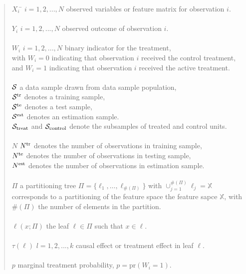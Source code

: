 \documentclass[11pt]{article}
\newcommand{\est}{{\rm est}}
\newcommand{\calp}{{\Pi}}
\newcommand{\cals}{{\cal S}}
\newcommand{\train}{{\rm tr}}
\newcommand{\test}{{\rm te}}
\begin{document}
\begin{quote}
\begin{tabbing}
$X_i$ \qquad\qquad \= $i = 1, 2,..., N$ \qquad observed variables or feature matrix for observation $i$.\\
\\
$Y_i$ \> $i = 1, 2, ..., N$ \qquad observed outcome of observation $i$.\\
\\
$W_i$ \>$i = 1, 2, ..., N$ \qquad binary indicator for the treatment,\\
\>with $W_i = 0$ indicating that observation $i$ received the control treatment, \\
\>and $W_i = 1$ indicating that observation $i$ received the active treatment.\\
\\
$\cals$ \> a data sample drawn from data sample population, \\
\> $\cals^{\text{tr}}$ denotes a training sample,\\
\> $\cals^{\text{te}}$ denotes a test sample, \\
\> $\cals^{\text{est}}$ denotes an estimation sample.\\
\> $\cals_{\text{treat}}$ and $\cals_{\text{control}}$ denote the subsamples of treated and control units.\\
\\
$N$ 
\> $N^\train$ denotes the number of observations in training sample,\\
\> $N^\test$ denotes the number of observations in testing sample,\\
\> $N^\est$ denotes the number of observations in estimation sample.\\
\\
$\Pi$ \>  a partitioning tree $\calp=\{\ell_1,\ldots,\ell_{\#(\Pi)}\}$ with $\cup_{j=1}^{\#(\calp)} \ell_j=\mathbb{X}$ \\ 
\> corresponds to a partitioning of the feature space the feature sapce $\mathbb{X}$, with\\
\> $\#(\calp)$ the number of elements in the partition.\\
\\
$\ell(x; \calp)$ \> the leaf $\ell \in \calp$ such that $x \in \ell$.\\
\\

$\tau(\ell)$ \> $l = 1, 2, ..., k$ \qquad causal effect or treatment effect in leaf $\ell$. \\
\\
$p$ \> marginal treatment probability, $p = \text{pr}(W_i = 1)$. 

\end{tabbing}
\end{quote}
\end{document}
